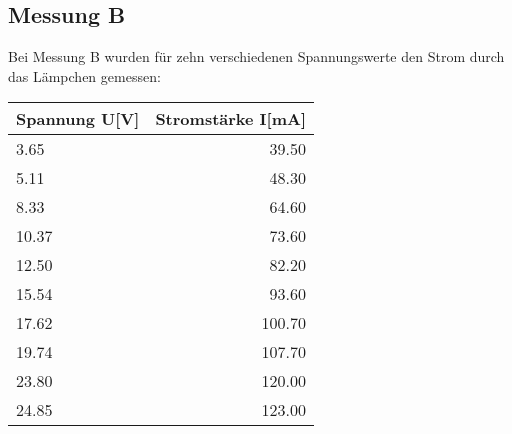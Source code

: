 \documentclass[12pt, a4paper, twoside]{article}
\begin{document}
    \subsection{Messung B}
    Bei Messung B wurden für zehn verschiedenen Spannungswerte den Strom durch das Lämpchen gemessen:\\
    \begin{center}
        \begin{tabular}{l|r}
            \textbf{Spannung U[V]} & \textbf{Stromstärke I[mA]}\\
            \hline
            3.65 & 39.50\\
            5.11 & 48.30\\
            8.33 & 64.60\\
            10.37 & 73.60\\
            12.50 & 82.20\\
            15.54 & 93.60\\
            17.62 & 100.70\\
            19.74 & 107.70\\
            23.80 & 120.00\\
            24.85 & 123.00
        \end{tabular}
    \end{center}
\end{document}
